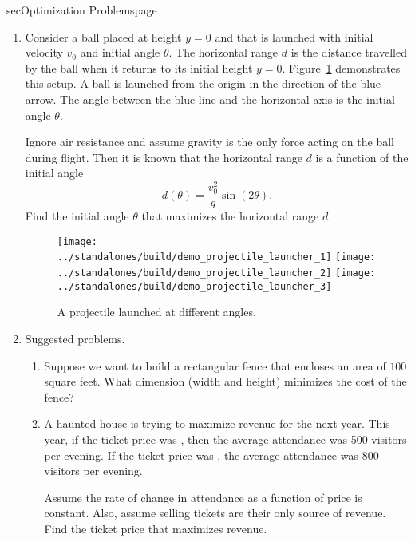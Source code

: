 \documentclass[../main]{subfiles}
\begin{document}
\begin{outline}{sec}{Optimization Problems}{page} \label{outline:optimization}
  \begin{enumerate}
    \item Consider a ball placed at height \(y = 0\) and that is launched with initial velocity \(v_{0}\) and initial angle \(\theta\). The horizontal range \(d\) is the distance travelled by the ball when it returns to its initial height \(y = 0\). Figure~\ref{fig:projectile} demonstrates this setup. A ball is launched from the origin in the direction of the blue arrow. The angle between the blue line and the horizontal axis is the initial angle \(\theta\).

      Ignore air resistance and assume gravity is the only force acting on the ball during flight. Then it is known that the horizontal range \(d\) is a function of the initial angle
      \[
        d(\theta) = \dfrac{v_{0}^{2}}{g} \sin(2\theta).
      \]
      Find the initial angle \(\theta\) that maximizes the horizontal range \(d\).
      \begin{figure}[h]
        \texttt{[image: ../standalones/build/demo\_projectile\_launcher\_1]}
        \quad
        \texttt{[image: ../standalones/build/demo\_projectile\_launcher\_2]}
        \quad
        \texttt{[image: ../standalones/build/demo\_projectile\_launcher\_3]}
        \caption{A projectile launched at different angles.}
        \label{fig:projectile}
      \end{figure}
      
    \item Suggested problems.
      \begin{enumerate}
        \item Suppose we want to build a rectangular fence that encloses an area of \(100\) square feet. What dimension (width and height) minimizes the cost of the fence?

        \item A haunted house is trying to maximize revenue for the next year.  This year, if the ticket price was , then the average attendance was 500 visitors per evening. If the ticket price was , the average attendance was 800 visitors per evening.

          Assume the rate of change in attendance as a function of price is constant. Also, assume selling tickets are their only source of revenue. Find the ticket price that maximizes revenue.


\end{enumerate}
\end{enumerate}
\end{outline}
\end{document}
